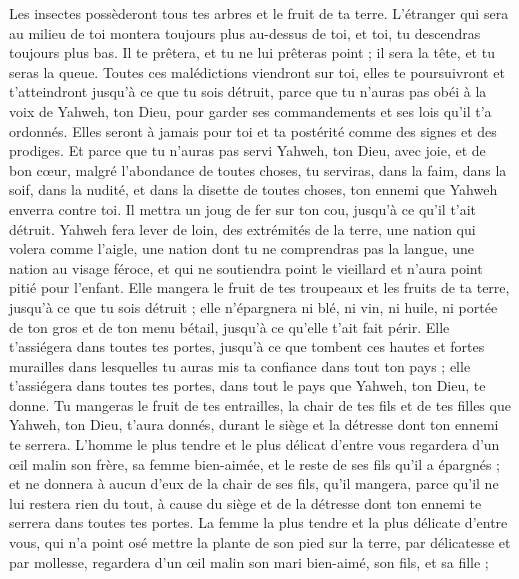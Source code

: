 \begin{multicols}{2}
Les insectes possèderont tous tes arbres et le fruit de ta terre.
L'étranger qui sera au milieu de toi montera toujours plus au-dessus de toi, et toi, tu descendras toujours plus bas.
Il te prêtera, et tu ne lui prêteras point ; il sera la tête, et tu seras la queue.
Toutes ces malédictions viendront sur toi, elles te poursuivront et t'atteindront jusqu'à ce que tu sois détruit, parce que tu n'auras pas obéi à la voix de Yahweh, ton Dieu, pour garder ses commandements et ses lois qu'il t'a ordonnés.
Elles seront à jamais pour toi et ta postérité comme des signes et des prodiges.
Et parce que tu n'auras pas servi Yahweh, ton Dieu, avec joie, et de bon cœur, malgré l'abondance de toutes choses,
tu serviras, dans la faim, dans la soif, dans la nudité, et dans la disette de toutes choses, ton ennemi que Yahweh enverra contre toi. Il mettra un joug de fer sur ton cou, jusqu'à ce qu'il t'ait détruit.
Yahweh fera lever de loin, des extrémités de la terre, une nation qui volera comme l'aigle, une nation dont tu ne comprendras pas la langue,
une nation au visage féroce, et qui ne soutiendra point le vieillard et n'aura point pitié pour l'enfant.
Elle mangera le fruit de tes troupeaux et les fruits de ta terre, jusqu'à ce que tu sois détruit ; elle n'épargnera ni blé, ni vin, ni huile, ni portée de ton gros et de ton menu bétail, jusqu'à ce qu'elle t'ait fait périr.
Elle t'assiégera dans toutes tes portes, jusqu'à ce que tombent ces hautes et fortes murailles dans lesquelles tu auras mis ta confiance dans tout ton pays ; elle t'assiégera dans toutes tes portes, dans tout le pays que Yahweh, ton Dieu, te donne.
Tu mangeras le fruit de tes entrailles, la chair de tes fils et de tes filles que Yahweh, ton Dieu, t'aura donnés, durant le siège et la détresse dont ton ennemi te serrera.
L'homme le plus tendre et le plus délicat d'entre vous regardera d'un œil malin son frère, sa femme bien-aimée, et le reste de ses fils qu'il a épargnés ;
et ne donnera à aucun d'eux de la chair de ses fils, qu'il mangera, parce qu'il ne lui restera rien du tout, à cause du siège et de la détresse dont ton ennemi te serrera dans toutes tes portes.
La femme la plus tendre et la plus délicate d'entre vous, qui n'a point osé mettre la plante de son pied sur la terre, par délicatesse et par mollesse, regardera d'un œil malin son mari bien-aimé, son fils, et sa fille ;

\end{multicols}
